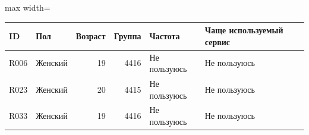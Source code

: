 {%
\small
\setlength{\tabcolsep}{3.0pt}
\renewcommand{\arraystretch}{1.12}
\begin{adjustbox}{max width=\textwidth}
\begin{tabular}{llrrll}
\toprule
ID & Пол & Возраст & Группа & Частота & Чаще используемый сервис \\
\midrule
R006 & Женский & 19 & 4416 & Не пользуюсь & Не пользуюсь \\
R023 & Женский & 20 & 4415 & Не пользуюсь & Не пользуюсь \\
R033 & Женский & 19 & 4416 & Не пользуюсь & Не пользуюсь \\
\bottomrule
\end{tabular}
\end{adjustbox}
}